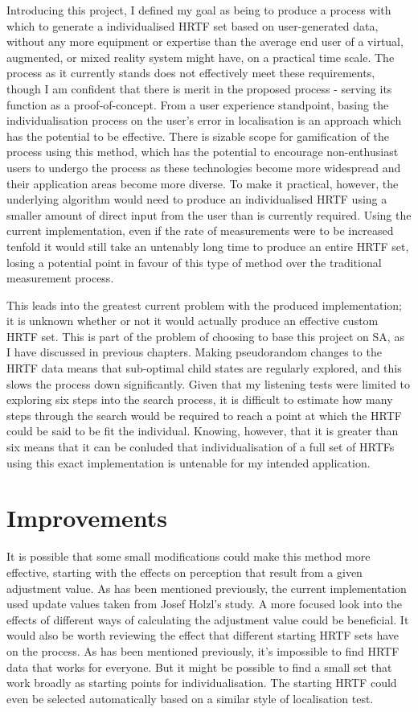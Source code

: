 Introducing this project, I defined my goal as being to produce a process with which to generate a individualised HRTF set based on user-generated data, without any more equipment or expertise than the average end user of a virtual, augmented, or mixed reality system might have, on a practical time scale. The process as it currently stands does not effectively meet these requirements, though I am confident that there is merit in the proposed process - serving its function as a proof-of-concept. From a user experience standpoint, basing the individualisation process on the user's error in localisation is an approach which has the potential to be effective. There is sizable scope for gamification of the process using this method, which has the potential to encourage non-enthusiast users to undergo the process as these technologies become more widespread and their application areas become more diverse. To make it practical, however, the underlying algorithm would need to produce an individualised HRTF using a smaller amount of direct input from the user than is currently required. Using the current implementation, even if the rate of measurements were to be increased tenfold it would still take an untenably long time to produce an entire HRTF set, losing a potential point in favour of this type of method over the traditional measurement process. 

This leads into the greatest current problem with the produced implementation; it is unknown whether or not it would actually produce an effective custom HRTF set. This is part of the problem of choosing to base this project on SA, as I have discussed in previous chapters. Making pseudorandom changes to the HRTF data means that sub-optimal child states are regularly explored, and this slows the process down significantly. Given that my listening tests were limited to exploring six steps into the search process, it is difficult to estimate how many steps through the search would be required to reach a point at which the HRTF could be said to be fit the individual. Knowing, however, that it is greater than six means that it can be conluded that individualisation of a full set of HRTFs using this exact implementation is untenable for my intended application.

\section{Improvements}

It is possible that some small modifications could make this method more effective, starting with the effects on perception that result from a given adjustment value. As has been mentioned previously, the current implementation used update values taken from Josef Holzl's study. A more focused look into the effects of different ways of calculating the adjustment value could be beneficial. It would also be worth reviewing the effect that different starting HRTF sets have on the process. As has been mentioned previously, it's impossible to find HRTF data that works for everyone. But it might be possible to find a small set that work broadly as starting points for individualisation. The starting HRTF could even be selected automatically based on a similar style of localisation test. 

